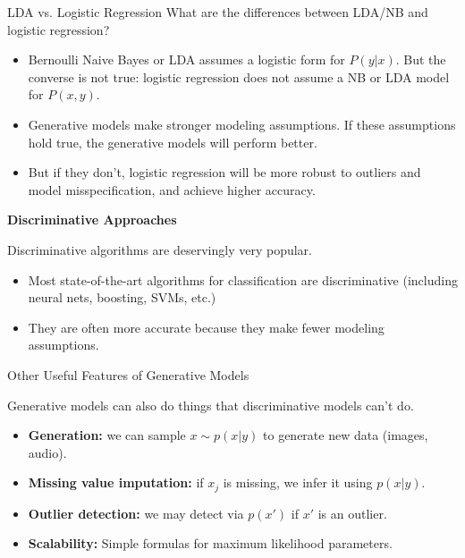 \documentclass[../../main.tex]{subfiles}
\begin{document}
\begin{frame}[fragile]{LDA vs. Logistic Regression}
What are the differences between LDA/NB and logistic regression?


\begin{itemize}
    \item Bernoulli Naive Bayes or LDA assumes a logistic form for $P(y|x)$. But the converse is not true: logistic regression does not assume a NB or LDA model for $P(x,y)$.
    \item Generative models make stronger modeling assumptions. If these assumptions hold true, the generative models will perform better.
    \item But if they don't, logistic regression will be more robust to outliers and model misspecification, and achieve higher accuracy.
\end{itemize}
\vspace{0.2cm}


\textbf{Discriminative Approaches}

Discriminative algorithms are deservingly very popular.
\begin{itemize}
    \item Most state-of-the-art algorithms for classification are discriminative (including neural nets, boosting, SVMs, etc.)
    \item They are often more accurate because they make fewer modeling assumptions.
\end{itemize}



\end{frame}


\begin{frame}[fragile]{Other Useful Features of Generative Models}


Generative models can also do things that discriminative models can't do.
\begin{itemize}
    \item \textbf{Generation:} we can sample $x \sim p(x|y)$ to generate new data (images, audio).
    \item \textbf{Missing value imputation:} if $x_j$ is missing, we infer it using $p(x|y)$.
    \item \textbf{Outlier detection:} we may detect via $p(x')$ if $x'$ is an outlier.
    \item \textbf{Scalability:} Simple formulas for maximum likelihood parameters.
\end{itemize}

\end{frame}
\end{document}
